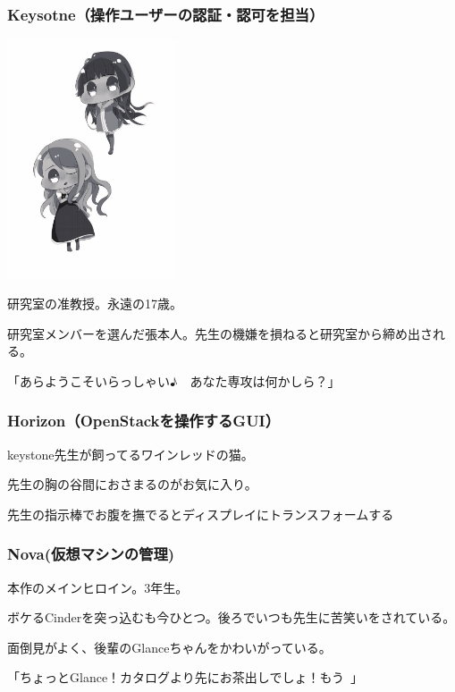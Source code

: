 \documentclass[8pt,b5paper,tombo,openany]{jsbook}
\begin{document}
\subsubsection{Keysotne（操作ユーザーの認証・認可を担当）}

\begin{floatingfigure}[r]{5cm}
  \includegraphics[width=5cm]{./img/char1.pdf}
\end{floatingfigure}

研究室の准教授。永遠の17歳。

研究室メンバーを選んだ張本人。先生の機嫌を損ねると研究室から締め出される。

「あらようこそいらっしゃい♪　あなた専攻は何かしら？」

\subsubsection{Horizon（OpenStackを操作するGUI）}

keystone先生が飼ってるワインレッドの猫。

先生の胸の谷間におさまるのがお気に入り。

先生の指示棒でお腹を撫でるとディスプレイにトランスフォームする

\subsubsection{Nova(仮想マシンの管理)}

本作のメインヒロイン。3年生。

ボケるCinderを突っ込むも今ひとつ。後ろでいつも先生に苦笑いをされている。

面倒見がよく、後輩のGlanceちゃんをかわいがっている。

「ちょっとGlance！カタログより先にお茶出しでしょ！もう~」
\end{document}
